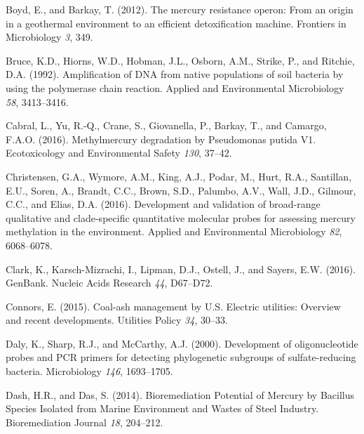 \documentclass[ms, hidelinks]{uncgdissertationexp}
\theoremstyle{plain}
\theoremstyle{definition}
\theoremstyle{remark}
\begin{document}
\leavevmode\hypertarget{ref-boydMercuryResistanceOperon2012}{}%
Boyd, E., and Barkay, T. (2012). The mercury resistance operon: From an origin in a geothermal environment to an efficient detoxification machine. Frontiers in Microbiology \emph{3}, 349.

\leavevmode\hypertarget{ref-bruceAmplificationDNANative1992}{}%
Bruce, K.D., Hiorns, W.D., Hobman, J.L., Osborn, A.M., Strike, P., and Ritchie, D.A. (1992). Amplification of DNA from native populations of soil bacteria by using the polymerase chain reaction. Applied and Environmental Microbiology \emph{58}, 3413--3416.

\leavevmode\hypertarget{ref-cabralMethylmercuryDegradationPseudomonas2016}{}%
Cabral, L., Yu, R.-Q., Crane, S., Giovanella, P., Barkay, T., and Camargo, F.A.O. (2016). Methylmercury degradation by Pseudomonas putida V1. Ecotoxicology and Environmental Safety \emph{130}, 37--42.

\leavevmode\hypertarget{ref-christensenDevelopmentValidationBroadrange2016}{}%
Christensen, G.A., Wymore, A.M., King, A.J., Podar, M., Hurt, R.A., Santillan, E.U., Soren, A., Brandt, C.C., Brown, S.D., Palumbo, A.V., Wall, J.D., Gilmour, C.C., and Elias, D.A. (2016). Development and validation of broad-range qualitative and clade-specific quantitative molecular probes for assessing mercury methylation in the environment. Applied and Environmental Microbiology \emph{82}, 6068--6078.

\leavevmode\hypertarget{ref-clarkGenBank2016}{}%
Clark, K., Karsch-Mizrachi, I., Lipman, D.J., Ostell, J., and Sayers, E.W. (2016). GenBank. Nucleic Acids Research \emph{44}, D67--D72.

\leavevmode\hypertarget{ref-connorsCoalashManagementElectric2015}{}%
Connors, E. (2015). Coal-ash management by U.S. Electric utilities: Overview and recent developments. Utilities Policy \emph{34}, 30--33.

\leavevmode\hypertarget{ref-dalyDevelopmentOligonucleotideProbes2000}{}%
Daly, K., Sharp, R.J., and McCarthy, A.J. (2000). Development of oligonucleotide probes and PCR primers for detecting phylogenetic subgroups of sulfate-reducing bacteria. Microbiology \emph{146}, 1693--1705.

\leavevmode\hypertarget{ref-dashBioremediationPotentialMercury2014}{}%
Dash, H.R., and Das, S. (2014). Bioremediation Potential of Mercury by Bacillus Species Isolated from Marine Environment and Wastes of Steel Industry. Bioremediation Journal \emph{18}, 204--212.
\end{document}

